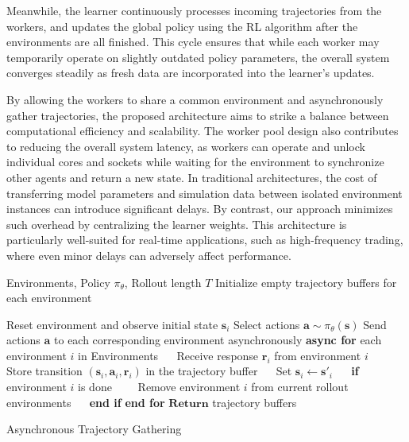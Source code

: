 \documentclass[11pt]{article}
\begin{document}
    Meanwhile, the learner continuously processes incoming trajectories from the workers,
    and updates the global policy using the RL algorithm after the environments are all finished.
    This cycle ensures that while each worker may temporarily operate on slightly outdated policy parameters,
    the overall system converges steadily as fresh data are incorporated into the learner's updates.

    By allowing the workers to share a common environment and asynchronously gather trajectories,
    the proposed architecture aims to strike a balance between computational efficiency and scalability.
    The worker pool design also contributes to reducing the overall system latency,
    as workers can operate and unlock individual cores and sockets while waiting for the environment to synchronize other agents and return a new state.
    In traditional architectures, the cost of transferring model parameters and simulation data between isolated environment instances can introduce significant delays.
    By contrast, our approach minimizes such overhead by centralizing the learner weights.
    This architecture is particularly well-suited for real-time applications, such as high-frequency trading,
    where even minor delays can adversely affect performance.

    \begin{algorithm}
        \begin{algorithmic}[1]
            \Require Environments, Policy $\pi_{\theta}$, Rollout length $T$
            \State Initialize empty trajectory buffers for each environment

                \State Reset environment and observe initial state $\mathbf{s}_i$
            \EndFor
                \State Select actions $\mathbf{a} \sim \pi_{\theta}(\mathbf{s})$
                \State Send actions $\mathbf{a}$ to each corresponding environment asynchronously
                \State \textbf{async for} {each environment $i$ in Environments}
                \State $\quad$ Receive response $\mathbf{r}_i$ from environment $i$
                \State $\quad$ Store transition $(\mathbf{s}_i, \mathbf{a}_i, \mathbf{r}_i)$ in the trajectory buffer
                \State $\quad$ Set $\mathbf{s}_i \leftarrow \mathbf{s'}_i$
                \State $\quad$ \textbf{if} environment $i$ is done
                \State $\quad$$\quad$Remove environment $i$ from current rollout environments
                \State $\quad$ \textbf{end if}
                \State \textbf{end for}
            \EndFor
            \State $\textbf{Return}$ trajectory buffers
        \end{algorithmic}
        \caption{Asynchronous Trajectory Gathering}
        \label{alg:trajectory}
    \end{algorithm}
\end{document}
